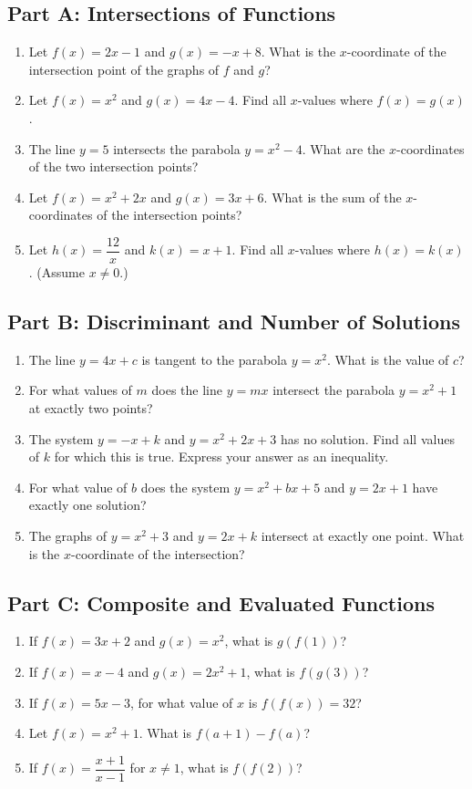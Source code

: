 \documentclass[14pt]{extarticle}
\begin{document}
\subsection*{Part A: Intersections of Functions}
\begin{enumerate}
  \item Let \(f(x) = 2x - 1\) and \(g(x) = -x + 8\). What is the \(x\)-coordinate of the intersection point of the graphs of \(f\) and \(g\)?
  \item Let \(f(x) = x^2\) and \(g(x) = 4x - 4\). Find all \(x\)-values where \(f(x) = g(x)\).
  \item The line \(y = 5\) intersects the parabola \(y = x^2 - 4\). What are the \(x\)-coordinates of the two intersection points?
  \item Let \(f(x) = x^2 + 2x\) and \(g(x) = 3x + 6\). What is the sum of the \(x\)-coordinates of the intersection points?
  \item Let \(h(x) = \dfrac{12}{x}\) and \(k(x) = x + 1\). Find all \(x\)-values where \(h(x) = k(x)\). (Assume \(x \neq 0\).)
\end{enumerate}

\subsection*{Part B: Discriminant and Number of Solutions}
\begin{enumerate}
  \item The line \(y = 4x + c\) is tangent to the parabola \(y = x^2\). What is the value of \(c\)?
  \item For what values of \(m\) does the line \(y = mx\) intersect the parabola \(y = x^2 + 1\) at exactly two points?
  \item The system \(y = -x + k\) and \(y = x^2 + 2x + 3\) has no solution. Find all values of \(k\) for which this is true. Express your answer as an inequality.
  \item For what value of \(b\) does the system \(y = x^2 + bx + 5\) and \(y = 2x + 1\) have exactly one solution?
  \item The graphs of \(y = x^2 + 3\) and \(y = 2x + k\) intersect at exactly one point. What is the \(x\)-coordinate of the intersection?
\end{enumerate}

\subsection*{Part C: Composite and Evaluated Functions}
\begin{enumerate}
  \item If \(f(x) = 3x + 2\) and \(g(x) = x^2\), what is \(g(f(1))\)?
  \item If \(f(x) = x - 4\) and \(g(x) = 2x^2 + 1\), what is \(f(g(3))\)?
  \item If \(f(x) = 5x - 3\), for what value of \(x\) is \(f(f(x)) = 32\)?
  \item Let \(f(x) = x^2 + 1\). What is \(f(a + 1) - f(a)\)?
  \item If \(f(x) = \dfrac{x + 1}{x - 1}\) for \(x \neq 1\), what is \(f(f(2))\)?
\end{enumerate}
\end{document}
